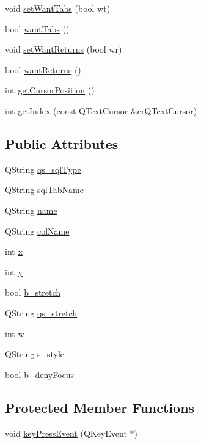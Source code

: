\begin{DoxyCompactItemize}
\item 
void \hyperlink{classTextEdit_a283eee89c52400012309b27a2e09c30d}{setWantTabs} (bool wt)
\item 
bool \hyperlink{classTextEdit_ad090015f64cbce8d95b15ef06f263de7}{wantTabs} ()
\item 
void \hyperlink{classTextEdit_a36bad9df78fec954468cfa08f671ebf0}{setWantReturns} (bool wr)
\item 
bool \hyperlink{classTextEdit_a0e46241532d1637179f43b3524a3c99f}{wantReturns} ()
\item 
int \hyperlink{classTextEdit_aefba879c066dd23e3b1684a484d1c99f}{getCursorPosition} ()
\item 
int \hyperlink{classTextEdit_a10de69bf6549f2b8f3cce1a76ee096f5}{getIndex} (const QTextCursor \&crQTextCursor)
\end{DoxyCompactItemize}
\subsection*{Public Attributes}
\begin{DoxyCompactItemize}
\item 
QString \hyperlink{classTextEdit_afd36a05b3b17d867962ac4f6fb35ef34}{qs\_\-sqlType}
\item 
QString \hyperlink{classTextEdit_af5c9b9e3cb3f368c7d19e4bf5fecc37a}{sqlTabName}
\item 
QString \hyperlink{classTextEdit_a3701b552998825c3eef0a125f3dfdd43}{name}
\item 
QString \hyperlink{classTextEdit_afa84afb50eea1aee08fe4ae71bb4239e}{colName}
\item 
int \hyperlink{classTextEdit_adab33b65d433239f87a12560bc2f2a21}{x}
\item 
int \hyperlink{classTextEdit_a90c945cd2f04eeb3d7f634ff9053fc23}{y}
\item 
bool \hyperlink{classTextEdit_a19bd4ec1ee98f319933d33f9afe170b8}{b\_\-stretch}
\item 
QString \hyperlink{classTextEdit_ab0ce9d289269262659caac4e5a3083b7}{qs\_\-stretch}
\item 
int \hyperlink{classTextEdit_a5f3dbfec116053d6257ab51a85411a21}{w}
\item 
QString \hyperlink{classTextEdit_a13f16a0f85b59391e8b4ab3928f78f7d}{s\_\-style}
\item 
bool \hyperlink{classTextEdit_ac45b8118dfcc4bfbda9e0d3fd52898f7}{b\_\-denyFocus}
\end{DoxyCompactItemize}
\subsection*{Protected Member Functions}
\begin{DoxyCompactItemize}
\item 
void \hyperlink{classTextEdit_a7b4e4c554377b9864d0f00e438a524fb}{keyPressEvent} (QKeyEvent $\ast$)
\end{DoxyCompactItemize}
